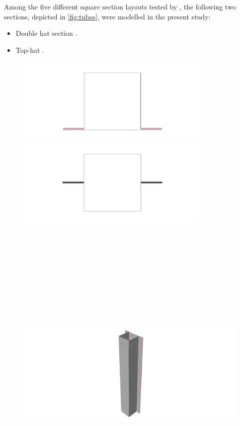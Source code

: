 \documentclass[
documentsize = a4, %
font = cmr, %
typesize = 11, %
printmode = true,
onehalfspacing = true,
language = en, %
titlepage = udciccp, %
degree = pt, %
dedication = true,
acknowledgements = true,
abstract-en = true,
abstract-es = false,
abstract-ga = false,
epigraphs = true,
toc = true,
lof = true,
lot = true,
frontmatterintoc = false,
notation = false,
minimal = false,
]{UDCthesis}
\begin{document}
Among the five different square section layouts tested by \citet{Peroni2009}, the following two sections, depicted in \cref{fig:tubes}, were modelled in the present study:
\begin{itemize}
	\item Double hat section \citep{Lee2006, Yang2012, Yamashita2013}.
	\item Top-hat \citep{Scattina2011, Yamashita2013}.
\end{itemize}

\begin{figure}
	\centering
	\begin{minipage}[b]{.45\columnwidth}
		\centering
		\includegraphics[height=42mm]{IMG_CUTRES/A_section}
	\end{minipage}
	\hfill
	\begin{minipage}[b]{.45\columnwidth}
		\centering
		\includegraphics[height=42mm]{IMG_CUTRES/B_section}
	\end{minipage}
\\[10mm]
\begin{minipage}[b]{.4\linewidth}
	\centering
	\includegraphics[height=135mm]{IMG_CUTRES/A_tube}

\end{minipage}
\end{figure}
\end{document}
